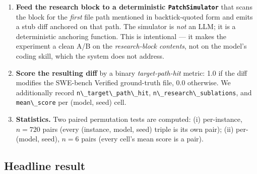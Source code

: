 \begin{enumerate}
  \begin{itemize}
  \tightlist
  \item
    \textbf{\passthrough{\lstinline!with\_harness!} arm.} Insert every snippet via \passthrough{\lstinline!context\_insert!}; trigger \passthrough{\lstinline!sublate\_with\_evidence!} for every stale-vs-fresh pair via the dominance rule; then assemble the block from \passthrough{\lstinline!live!} items only, truncating from the end if the budget is exceeded.
  \item
    \textbf{\passthrough{\lstinline!without\_harness!} arm.} Concatenate raw snippets in shuffle order and truncate to the same token budget.
  \end{itemize}
\item
  \textbf{Feed the research block to a deterministic \passthrough{\lstinline!PatchSimulator!}} that scans the block for the \emph{first} file path mentioned in backtick-quoted form and emits a stub diff anchored on that path. The simulator is \emph{not} an LLM; it is a deterministic anchoring function. This is intentional --- it makes the experiment a clean A/B on the \emph{research-block contents}, not on the model's coding skill, which the system does not address.
\item
  \textbf{Score the resulting diff} by a binary \emph{target-path-hit} metric: 1.0 if the diff modifies the SWE-bench Verified ground-truth file, 0.0 otherwise. We additionally record \passthrough{\lstinline!n\_target\_path\_hit!}, \passthrough{\lstinline!n\_research\_sublations!}, and \passthrough{\lstinline!mean\_score!} per (model, seed) cell.
\item
  \textbf{Statistics.} Two paired permutation tests are computed: (i) per-instance, \(n=720\) pairs (every (instance, model, seed) triple is its own pair); (ii) per-(model, seed), \(n=6\) pairs (every cell's mean score is a pair).
\end{enumerate}

\subsection{Headline result}\label{headline-result}

